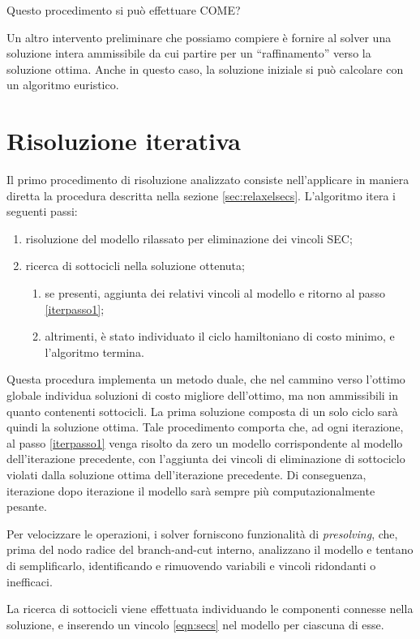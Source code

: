 Questo procedimento si può effettuare COME?

Un altro intervento preliminare che possiamo compiere è fornire al solver una soluzione intera ammissibile da cui partire per un ``raffinamento'' verso la soluzione ottima. Anche in questo caso, la soluzione iniziale si può calcolare con un algoritmo euristico.

\section{Risoluzione iterativa}
Il primo procedimento di risoluzione analizzato consiste nell'applicare in maniera diretta la procedura descritta nella sezione \ref{sec:relaxelsecs}. L'algoritmo itera i seguenti passi:
\begin{enumerate}[noitemsep]
  \item risoluzione del modello rilassato per eliminazione dei vincoli SEC;\label{iterpasso1}
  \item ricerca di sottocicli nella soluzione ottenuta;
  \begin{enumerate}[noitemsep]
    \item se presenti, aggiunta dei relativi vincoli al modello e ritorno al passo \ref{iterpasso1};
    \item altrimenti, è stato individuato il ciclo hamiltoniano di costo minimo, e l'algoritmo termina.
  \end{enumerate}
\end{enumerate}

Questa procedura implementa un metodo duale, che nel cammino verso l'ottimo globale individua soluzioni di costo migliore dell'ottimo, ma non ammissibili in quanto contenenti sottocicli. La prima soluzione composta di un solo ciclo sarà quindi la soluzione ottima. Tale procedimento comporta che, ad ogni iterazione, al passo \ref{iterpasso1} venga risolto da zero un modello corrispondente al modello dell'iterazione precedente, con l'aggiunta dei vincoli di eliminazione di sottociclo violati dalla soluzione ottima dell'iterazione precedente. Di conseguenza, iterazione dopo iterazione il modello sarà sempre più computazionalmente pesante.

Per velocizzare le operazioni, i solver forniscono funzionalità di \textit{presolving}, che, prima del nodo radice del branch-and-cut interno, analizzano il modello e tentano di semplificarlo, identificando e rimuovendo variabili e vincoli ridondanti o inefficaci.

La ricerca di sottocicli viene effettuata individuando le componenti connesse nella soluzione, e inserendo un vincolo \ref{eqn:secs} nel modello per ciascuna di esse.


